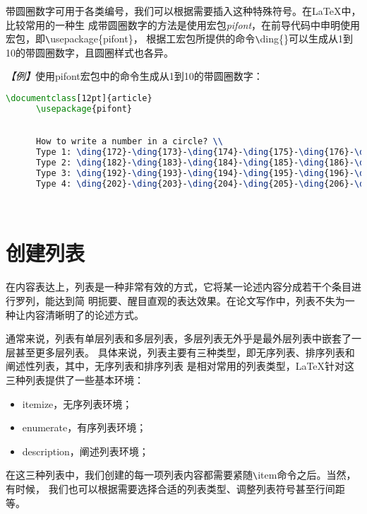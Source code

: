 {带圆圈数字可用于各类编号，我们可以根据需要插入这种特殊符号。在LaTeX中，比较常用的一种生
成带圆圈数字的方法是使用宏包\emph{pifont}，在前导代码中申明使用宏包，即\verb|\|usepackage\{pifont\}，
根据工宏包所提供的命令\verb|\|ding\{\}可以生成从1到10的带圆圈数字，且圆圈样式也各异。

\emph{【例】}使用pifont宏包中的命令生成从1到10的带圆圈数字：
\begin{lstlisting}[language=TeX]
      \documentclass[12pt]{article}
      \usepackage{pifont}
      

      How to write a number in a circle? \\
      Type 1: \ding{172}-\ding{173}-\ding{174}-\ding{175}-\ding{176}-\ding{177}-\ding{178}-\ding{179}-\ding{180}-\ding{181} \\     % 样式1是从172开始
      Type 2: \ding{182}-\ding{183}-\ding{184}-\ding{185}-\ding{186}-\ding{187}-\ding{188}-\ding{189}-\ding{190}-\ding{191} \\     % 样式2是从182开始
      Type 3: \ding{192}-\ding{193}-\ding{194}-\ding{195}-\ding{196}-\ding{197}-\ding{198}-\ding{199}-\ding{200}-\ding{201} \\     % 样式3是从192开始
      Type 4: \ding{202}-\ding{203}-\ding{204}-\ding{205}-\ding{206}-\ding{207}-\ding{208}-\ding{209}-\ding{210}-\ding{211} \\     % 样式4是从202开始

      
\end{lstlisting}

\section{创建列表}
在内容表达上，列表是一种非常有效的方式，它将某一论述内容分成若干个条目进行罗列，能达到简
明扼要、醒目直观的表达效果。在论文写作中，列表不失为一种让内容清晰明了的论述方式。

通常来说，列表有单层列表和多层列表，多层列表无外乎是最外层列表中嵌套了一层甚至更多层列表。
具体来说，列表主要有三种类型，即无序列表、排序列表和阐述性列表，其中，无序列表和排序列表
是相对常用的列表类型，LaTeX针对这三种列表提供了一些基本环境：
\begin{itemize}
      \item itemize，无序列表环境；
      \item enumerate，有序列表环境；
      \item description，阐述列表环境；
\end{itemize}

在这三种列表中，我们创建的每一项列表内容都需要紧随\verb|\|item命令之后。当然，有时候，
我们也可以根据需要选择合适的列表类型、调整列表符号甚至行间距等。

}
